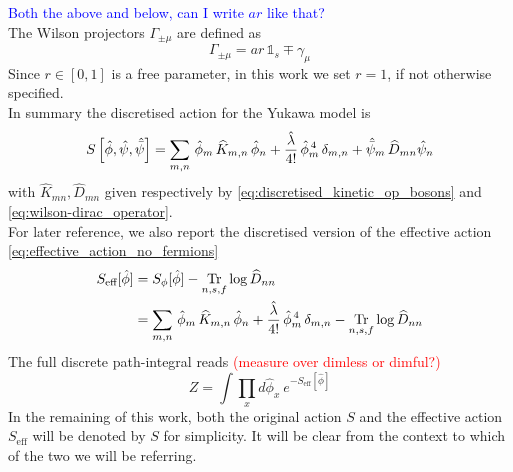 \textcolor{blue}{Both the above and below, can I write $ar$ like that?} \\
The Wilson projectors $\Gamma_{\pm \mu}$ are defined as
\begin{equation*}
    \Gamma_{\pm \mu} = ar \, \mathds{1}_s \mp \gamma_\mu 
\end{equation*}
Since $r \in [0,1]$ is a free parameter, in this work we set $r=1$, if not otherwise specified. \\
In summary the discretised action for the Yukawa model is 
\begin{equation*}
    S\left[\hat{\phi}, \hat{\psi}, \hat{\bar{\psi}} \right] = \sum_{m,n} \, \hat{\phi}_m \, \widehat{K}_{m,n} \, \hat{\phi}_n + \frac{\hat{\lambda}}{4!} \, \hat{\phi}_m^{\,4} \, \delta_{m,n} + \hat{\bar{\psi}}_m \, \widehat{D}_{mn} \hat{\psi}_n
\end{equation*}
with $\widehat{K}_{mn}, \widehat{D}_{mn}$ given respectively by \eqref{eq:discretised_kinetic_op_bosons} and \eqref{eq:wilson-dirac_operator}. \\
For later reference, we also report the discretised version of the effective action \eqref{eq:effective_action_no_fermions}
\begin{equation}
	\begin{aligned}
		S_\text{eff}[\hat\phi] 	&= S_\phi[\hat\phi] - \underset{n,s,f}{\operatorname{\text{Tr}}} \log \widehat{D}_{nn} \\
							&= \sum_{m,n} \, \hat{\phi}_m \, \widehat{K}_{m,n} \, \hat{\phi}_n + \frac{\hat{\lambda}}{4!} \, \hat{\phi}_m^{\,4} \, \delta_{m,n} - \underset{n,s,f}{\operatorname{\text{Tr}}} \log \widehat{D}_{nn} 
	\end{aligned}
	\label{eq:discretised_effective_action}
\end{equation}
The full discrete path-integral reads \textcolor{red}{(measure over dimless or dimful?)}
\begin{equation}
    Z = \int \prod_x d\hat\phi_x \ e^{-S_\text{eff}[\hat\phi]}
    \label{eq:discretised_path_integral}
\end{equation}
In the remaining of this work, both the original action $S$ and the effective action $S_\text{eff}$ will be denoted by $S$ for simplicity. It will be clear from the context to which of the two we will be referring. 

